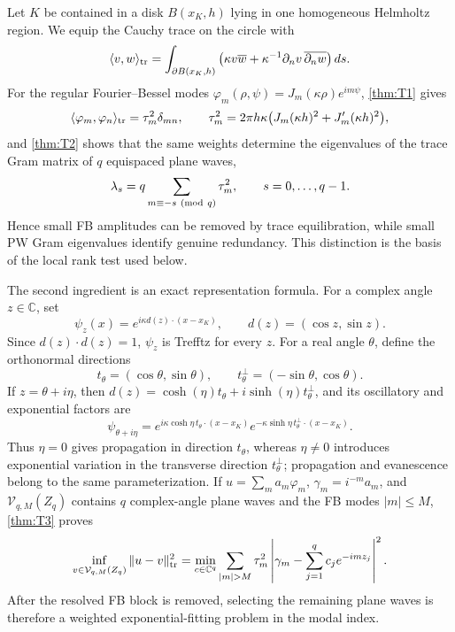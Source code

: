 \documentclass[11pt]{article}
\newcommand{\ii}{i}
\newcommand{\C}{\mathbb{C}}
\numberwithin{equation}{section}
\begin{document}
Let $K$ be contained in a disk $B(x_K,h)$ lying in one homogeneous Helmholtz region.  We equip the Cauchy trace on the circle with
\begin{equation}\label{eq:intro-trace}
 \langle v,w\rangle_{\rm tr}
 =\int_{\partial B(x_K,h)}
 \big(\kappa v\overline w+\kappa^{-1}\partial_n v\,\overline{\partial_n w}\big)\,ds.
\end{equation}
For the regular Fourier--Bessel modes $\varphi_m(\rho,\psi)=J_m(\kappa\rho)e^{\ii m\psi}$, \cref{thm:T1} gives
\begin{equation}\label{eq:tau-intro}
 \langle\varphi_m,\varphi_n\rangle_{\rm tr}=\tau_m^2\delta_{mn},\qquad
 \tau_m^2=2\pi h\kappa\big(J_m(\kappa h)^2+J_m'(\kappa h)^2\big),
\end{equation}
and \cref{thm:T2} shows that the same weights determine the eigenvalues of the trace Gram matrix of $q$ equispaced plane waves,
\begin{equation}\label{eq:lambda-intro}
 \lambda_s=q\sum_{m\equiv-s\ ({\rm mod}\ q)}\tau_m^2,
 \qquad s=0,\ldots,q-1.
\end{equation}
Hence small FB amplitudes can be removed by trace equilibration, while small PW Gram eigenvalues identify genuine redundancy.  This distinction is the basis of the local rank test used below.

The second ingredient is an exact representation formula.  For a complex angle $z\in\C$, set
\begin{equation}\label{eq:complex-pw-intro}
 \psi_z(x)=e^{\ii\kappa d(z)\cdot(x-x_K)},\qquad d(z)=(\cos z,\sin z).
\end{equation}
Since $d(z)\cdot d(z)=1$, $\psi_z$ is Trefftz for every $z$.  For a real angle $\theta$, define the orthonormal directions
\[
 t_\theta=(\cos\theta,\sin\theta),\qquad
 t_\theta^\perp=(-\sin\theta,\cos\theta).
\]
If $z=\theta+\ii\eta$, then $d(z)=\cosh(\eta)t_\theta+\ii\sinh(\eta)t_\theta^\perp$, and its oscillatory and exponential factors are
\begin{equation}\label{eq:evanescent-factor}
 \psi_{\theta+\ii\eta}
 =e^{\ii\kappa\cosh\eta\,t_\theta\cdot(x-x_K)}
  e^{-\kappa\sinh\eta\,t_\theta^\perp\cdot(x-x_K)}.
\end{equation}
Thus $\eta=0$ gives propagation in direction $t_\theta$, whereas $\eta\ne0$ introduces exponential variation in the transverse direction $t_\theta^\perp$; propagation and evanescence belong to the same parameterization.  If $u=\sum_m a_m\varphi_m$, $\gamma_m=\ii^{-m}a_m$, and $\mathcal V_{q,M}(Z_q)$ contains $q$ complex-angle plane waves and the FB modes $|m|\le M$, \cref{thm:T3} proves
\begin{equation}\label{eq:hybrid-intro}
 \inf_{v\in\mathcal V_{q,M}(Z_q)}\|u-v\|_{\rm tr}^2
 =\min_{c\in\C^q}\sum_{|m|>M}\tau_m^2
 \left|\gamma_m-\sum_{j=1}^q c_je^{-\ii m z_j}\right|^2.
\end{equation}
After the resolved FB block is removed, selecting the remaining plane waves is therefore a weighted exponential-fitting problem in the modal index.
\end{document}
